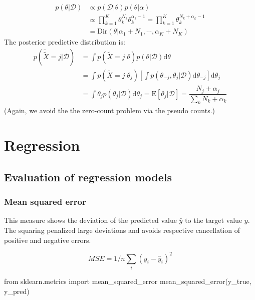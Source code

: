 \documentclass[
]{book}
\newenvironment{Shaded}{\begin{snugshade}}{\end{snugshade}}
\newcommand{\ImportTok}[1]{#1}
\newcommand{\NormalTok}[1]{#1}
\begin{document}
\[\begin{aligned}
            p({\theta}|\mathcal{D})& \propto p(\mathcal{D}|{\theta})p({\theta|\alpha}) \\
                & \propto \prod\limits_{k=1}^K\theta_k^{N_k}\theta_k^{\alpha_k-1} = \prod\limits_{k=1}^K\theta_k^{N_k+\alpha_k-1}\\
                & =\text{Dir}({\theta}|\alpha_1+N_1,\cdots,\alpha_K+N_K)
            \end{aligned}\] The posterior predictive distribution is:
\[\begin{aligned}
                p(\tilde{\tilde{X}}=j|\mathcal{D})& =\int p(\tilde{X}=j|{\theta})p({\theta}|\mathcal{D})\mathrm{d}{\theta} \\
                    & =\int p(\tilde{X}=j|\theta_j)\left[\int p({\theta}_{-j}, \theta_j|\mathcal{D})\mathrm{d}{\theta}_{-j}\right]\mathrm{d}\theta_j \\
                    & =\int \theta_jp(\theta_j|\mathcal{D})\mathrm{d}\theta_j=\text{E}[\theta_j|\mathcal{D}]=\dfrac{N_j+\alpha_j}{\sum_k N_k+\alpha_k}
                \end{aligned}\] (Again, we avoid the the zero-count
problem via the pseudo counts.)

\hypertarget{regression}{%
\chapter{Regression}\label{regression}}

\hypertarget{evaluation-of-regression-models}{%
\section{Evaluation of regression models}\label{evaluation-of-regression-models}}

\hypertarget{mean-squared-error}{%
\subsection{Mean squared error}\label{mean-squared-error}}

This measure shows the deviation of the predicted value \(\hat{y}\) to the target value \(y\). The squaring penalized large deviations and avoids respective cancellation of positive and negative errors.

\[ MSE = 1/n \sum_i (y_i - \hat{y}_i)^2\]

\begin{Shaded}
\begin{Highlighting}[]
\ImportTok{from}\NormalTok{ sklearn.metrics }\ImportTok{import}\NormalTok{ mean\_squared\_error}
\NormalTok{mean\_squared\_error(y\_true, y\_pred)}
\end{Highlighting}
\end{Shaded}
\end{document}
